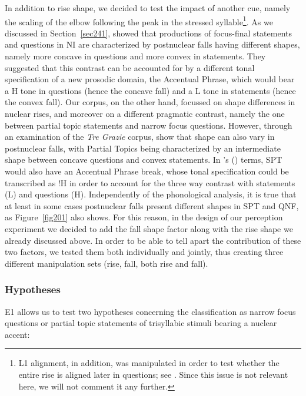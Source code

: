 In addition to rise shape, we decided to test the impact of another cue, namely the scaling of the elbow following the peak in the stressed syllable\footnote{L1 alignment, in addition, was manipulated in order to test whether the entire rise is aligned later in questions; see \citet{dimperio2003tonal}. Since this issue is not relevant here, we will not comment it any further.\label{footnoteL1}}. As we discussed in Section~\ref{sec241}, \citet{petrone2008tonal} showed that productions of focus-final statements and questions in NI are characterized by postnuclear falls having different shapes, namely more concave in questions and more convex in statements. They suggested that this contrast can be accounted for by a different tonal specification of a new prosodic domain, the Accentual Phrase, which would bear a H tone in questions (hence the concave fall) and a L tone in statements (hence the convex fall). Our corpus, on the other hand, focussed on shape differences in nuclear rises, and moreover on a different pragmatic contrast, namely the one between partial topic statements and narrow focus questions. However, through an examination of the \textit{Tre Grazie} corpus, \citet{dimperio2011phrasing} show that shape can also vary in postnuclear falls, with Partial Topics being characterized by an intermediate shape between concave questions and convex statements. In \citeauthor{petrone2008tonal}'s (\citeyear{petrone2008tonal}) terms, SPT would also have an Accentual Phrase break, whose tonal specification could be transcribed as !H in order to account for the three way contrast with statements (L) and questions (H). Independently of the phonological analysis, it is true that at least in some cases postnuclear falls present different shapes in SPT and QNF, as Figure~\ref{fig201} also shows. For this reason, in the design of our perception experiment we decided to add the fall shape factor along with the rise shape we already discussed above. In order to be able to tell apart the contribution of these two factors, we tested them both individually and jointly, thus creating three different manipulation sets (rise, fall, both rise and fall).

\subsubsection{Hypotheses}\label{sec3201}
E1 allows us to test two hypotheses concerning the classification as narrow focus questions or partial topic statements of trisyllabic stimuli bearing a nuclear accent:

